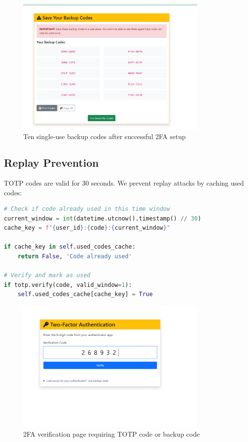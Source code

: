 \documentclass[12pt,a4paper]{article}
\begin{document}
\begin{figure}[H]
    \centering
    \includegraphics[width=0.85\textwidth]{SCREENSHOTs/backup codes.png}
    \caption{Ten single-use backup codes after successful 2FA setup}
    \label{fig:backup}
\end{figure}

\subsection{Replay Prevention}

TOTP codes are valid for 30 seconds. We prevent replay attacks by caching used codes:

\begin{lstlisting}[language=Python]
# Check if code already used in this time window
current_window = int(datetime.utcnow().timestamp() // 30)
cache_key = f"{user_id}:{code}:{current_window}"

if cache_key in self.used_codes_cache:
    return False, 'Code already used'

# Verify and mark as used
if totp.verify(code, valid_window=1):
    self.used_codes_cache[cache_key] = True
\end{lstlisting}

\begin{figure}[H]
    \centering
    \includegraphics[width=0.85\textwidth]{SCREENSHOTs/2fa login.png}
    \caption{2FA verification page requiring TOTP code or backup code}
    \label{fig:2fa_verify}
\end{figure}
\end{document}
